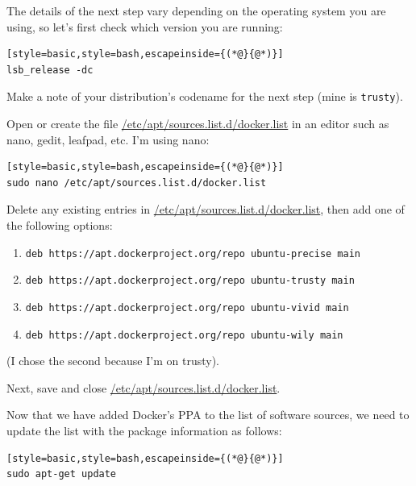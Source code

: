 \documentclass[12pt, a4paper, twoside, openany, titlepage]{book}
\begin{document}
The details of the next step vary depending on the operating system you are
using, so let's first check which version you are running:
\begin{lstlisting}[style=basic,style=bash,escapeinside={(*@}{@*)}]
lsb_release -dc
\end{lstlisting}
Make a note of your distribution's codename for the next step (mine is
\texttt{trusty}).

Open or create the file \url{/etc/apt/sources.list.d/docker.list} in an
editor such as nano, gedit, leafpad, etc. I'm using nano:
\begin{lstlisting}[style=basic,style=bash,escapeinside={(*@}{@*)}]
sudo nano /etc/apt/sources.list.d/docker.list
\end{lstlisting}

Delete any existing entries in \url{/etc/apt/sources.list.d/docker.list},
then add one of the following options:
\begin{enumerate}
\item{\texttt{deb https://apt.dockerproject.org/repo ubuntu-precise main}}
\item{\texttt{deb https://apt.dockerproject.org/repo ubuntu-trusty main}}
\item{\texttt{deb https://apt.dockerproject.org/repo ubuntu-vivid main}}
\item{\texttt{deb https://apt.dockerproject.org/repo ubuntu-wily main}}
\end{enumerate}
(I chose the second because I'm on trusty).


Next, save and close \url{/etc/apt/sources.list.d/docker.list}.

Now that we have added Docker's PPA to the list of
software sources, we need to update the list with the package information as
follows: \begin{lstlisting}[style=basic,style=bash,escapeinside={(*@}{@*)}]
sudo apt-get update \end{lstlisting}
\end{document}
